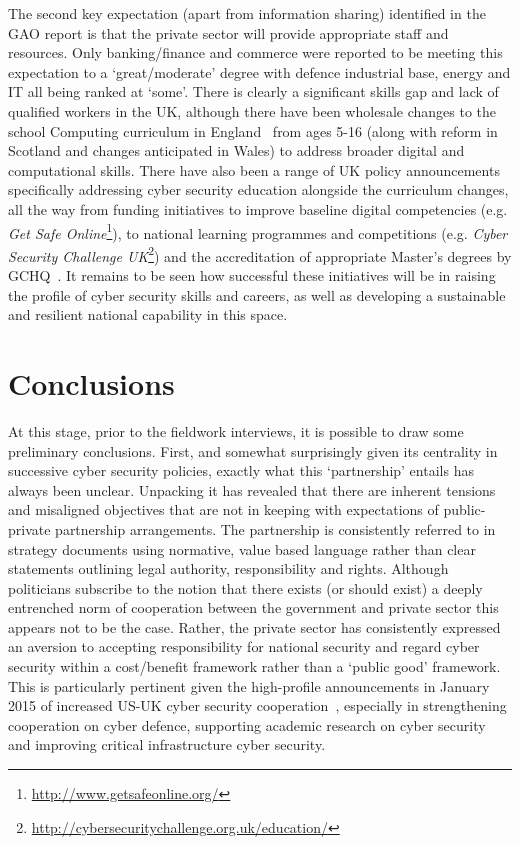 \documentclass[a4paper,11pt]{article}
\begin{document}
The second key expectation (apart from information sharing) identified
in the GAO report is that the private sector will provide appropriate
staff and resources. Only banking/finance and commerce were reported
to be meeting this expectation to a `great/moderate' degree with
defence industrial base, energy and IT all being ranked at
`some'. There is clearly a significant skills gap and lack of
qualified workers in the UK, although there have been wholesale
changes to the school Computing curriculum in
England~\cite{comppos:2013} from ages 5-16 (along with reform in
Scotland and changes anticipated in Wales) to address broader digital
and computational skills. There have also been a range of UK policy
announcements specifically addressing cyber security education
alongside the curriculum changes, all the way from funding initiatives
to improve baseline digital competencies (e.g. {\emph{Get Safe
Online}}\footnote{\url{http://www.getsafeonline.org/}}), to national
learning programmes and competitions (e.g. {\emph{Cyber Security
Challenge
UK}}\footnote{\url{http://cybersecuritychallenge.org.uk/education/}})
and the accreditation of appropriate Master's degrees by
GCHQ~\cite{gchqmasters:2014}. It remains to be seen how successful
these initiatives will be in raising the profile of cyber security
skills and careers, as well as developing a sustainable and resilient
national capability in this space.

\section{Conclusions}

At this stage, prior to the fieldwork interviews, it is possible to
draw some preliminary conclusions. First, and somewhat surprisingly
given its centrality in successive cyber security policies, exactly
what this `partnership' entails has always been unclear.  Unpacking it
has revealed that there are inherent tensions and misaligned
objectives that are not in keeping with expectations of public-private
partnership arrangements. The partnership is consistently referred to
in strategy documents using normative, value based language rather
than clear statements outlining legal authority, responsibility and
rights. Although politicians subscribe to the notion that there exists
(or should exist) a deeply entrenched norm of cooperation between the
government and private sector this appears not to be the case. Rather,
the private sector has consistently expressed an aversion to accepting
responsibility for national security and regard cyber security within
a cost/benefit framework rather than a `public good' framework. This
is particularly pertinent given the high-profile announcements in
January 2015 of increased US-UK cyber security
cooperation~\cite{whitehouse:2015}, especially in strengthening
cooperation on cyber defence, supporting academic research on
cyber security and improving critical infrastructure cyber security.
\end{document}
